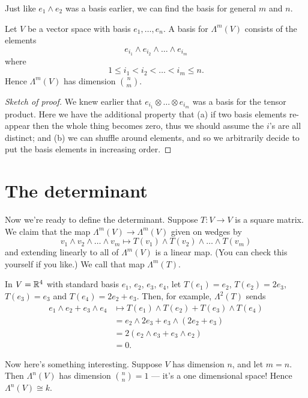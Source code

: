 Just like $e_1 \wedge e_2$ was a basis earlier, we can find the basis
for general $m$ and $n$.
\begin{proposition}
	Let $V$ be a vector space with basis $e_1, \dots, e_n$.
	A basis for $\Lambda^m(V)$ consists of the elements
	\[ e_{i_1} \wedge e_{i_2} \wedge \dots \wedge e_{i_m} \]
	where
	\[ 1 \le i_1 < i_2 < \dots < i_m \le n. \]
	Hence $\Lambda^m(V)$ has dimension $\binom nm$.
\end{proposition}
\begin{proof}[Sketch of proof]
	We knew earlier that $e_{i_1} \otimes \dots \otimes e_{i_m}$
	was a basis for the tensor product.
	Here we have the additional property that (a)
	if two basis elements re-appear then the whole thing becomes zero,
	thus we should assume the $i$'s are all distinct;
	and (b) we can shuffle around elements,
	and so we arbitrarily decide to put the basis elements
	in increasing order.
\end{proof}


\section{The determinant}
Now we're ready to define the determinant.
Suppose $T \colon V \to V$ is a square matrix.
We claim that the map $\Lambda^m(V) \to \Lambda^m(V)$ given on wedges by
\[ v_1 \wedge v_2 \wedge \dots \wedge v_m
	\mapsto T(v_1) \wedge T(v_2) \wedge \dots \wedge T(v_m) \]
and extending linearly to all of $\Lambda^m(V)$ is a linear map.
(You can check this yourself if you like.)
We call that map $\Lambda^m(T)$.
\begin{example}
	In $V = \mathbb R^4$ with standard basis $e_1$, $e_2$, $e_3$, $e_4$,
	let $T(e_1) = e_2$, $T(e_2) = 2e_3$, $T(e_3) = e_3$ and $T(e_4) = 2e_2 + e_3$.
	Then, for example, $\Lambda^2(T)$ sends
	\begin{align*}
		e_1 \wedge e_2 + e_3 \wedge e_4
		&\mapsto T(e_1) \wedge T(e_2) + T(e_3) \wedge T(e_4) \\
		&= e_2 \wedge 2e_3 + e_3 \wedge (2e_2 + e_3) \\
		&= 2(e_2 \wedge e_3 + e_3 \wedge e_2) \\
		&= 0.
	\end{align*}
\end{example}

Now here's something interesting.
Suppose $V$ has dimension $n$, and let $m=n$.
Then $\Lambda^n(V)$ has dimension $\binom nn = 1$ --- it's a one dimensional space!
Hence $\Lambda^n(V) \cong k$.

